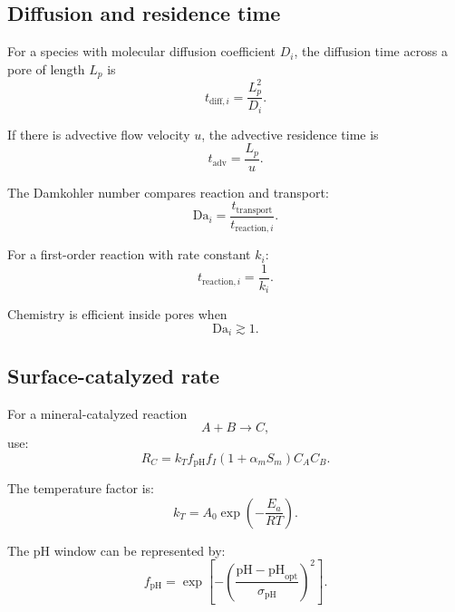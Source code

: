 \documentclass[11pt]{article}
\begin{document}
\subsection{Diffusion and residence time}

For a species with molecular diffusion coefficient $D_i$, the diffusion time
across a pore of length $L_p$ is
\begin{equation}
    t_{\mathrm{diff},i}
    =
    \frac{L_p^2}{D_i}.
\end{equation}

If there is advective flow velocity $u$, the advective residence time is
\begin{equation}
    t_{\mathrm{adv}} =
    \frac{L_p}{u}.
\end{equation}

The Damkohler number compares reaction and transport:
\begin{equation}
    \mathrm{Da}_i =
    \frac{t_{\mathrm{transport}}}{t_{\mathrm{reaction},i}}.
\end{equation}

For a first-order reaction with rate constant $k_i$:
\begin{equation}
    t_{\mathrm{reaction},i} = \frac{1}{k_i}.
\end{equation}

Chemistry is efficient inside pores when
\begin{equation}
    \mathrm{Da}_i \gtrsim 1.
\end{equation}

\subsection{Surface-catalyzed rate}

For a mineral-catalyzed reaction
\begin{equation}
    A + B \rightarrow C,
\end{equation}
use:
\begin{equation}
    R_C =
    k_T f_{\mathrm{pH}} f_I
    \left(1+\alpha_m S_m\right)
    C_A C_B.
\end{equation}

The temperature factor is:
\begin{equation}
    k_T = A_0 \exp\left(-\frac{E_a}{RT}\right).
\end{equation}

The pH window can be represented by:
\begin{equation}
    f_{\mathrm{pH}}
    =
    \exp\left[-\left(\frac{\mathrm{pH}-\mathrm{pH}_{\mathrm{opt}}}
    {\sigma_{\mathrm{pH}}}\right)^2\right].
\end{equation}
\end{document}
